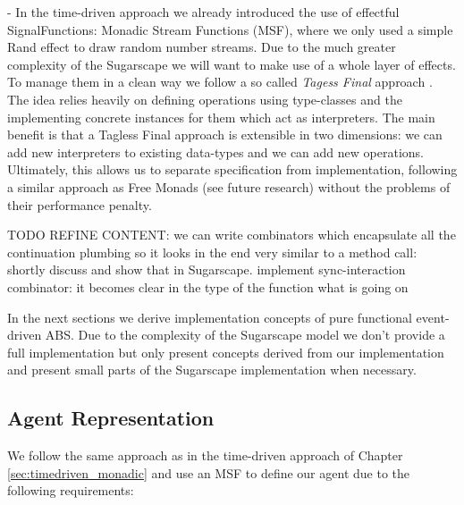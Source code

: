 - In the time-driven approach we already introduced the use of effectful SignalFunctions: Monadic Stream Functions (MSF), where we only used a simple Rand effect to draw random number streams. Due to the much greater complexity of the Sugarscape we will want to make use of a whole layer of effects. To manage them in a clean way we follow a so called \textit{Tagess Final} approach \cite{kiselyov_typed_2012}. The idea relies heavily on defining operations using type-classes and the implementing concrete instances for them which act as interpreters. The main benefit is that a Tagless Final approach is extensible in two dimensions: we can add new interpreters to existing data-types and we can add new operations. Ultimately, this allows us to separate specification from implementation, following a similar approach as Free Monads (see future research) without the problems of their performance penalty.


TODO REFINE CONTENT: we can write combinators which encapsulate all the continuation plumbing so it looks in the end very similar to a method call: shortly discuss and show that in Sugarscape. implement sync-interaction combinator: it becomes clear in the type of the function what is going on

In the next sections we derive implementation concepts of pure functional event-driven ABS. Due to the complexity of the Sugarscape model we don't provide a full implementation but only present concepts derived from our implementation and present small parts of the Sugarscape implementation when necessary.

\subsection{Agent Representation}
We follow the same approach as in the time-driven approach of Chapter \ref{sec:timedriven_monadic} and use an MSF to define our agent due to the following requirements:

